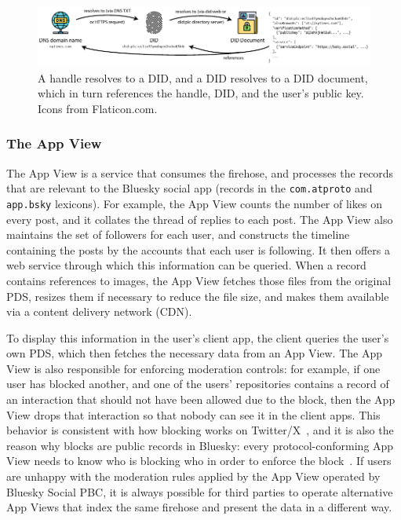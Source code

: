 \documentclass[sigconf]{acmart}
\begin{document}
\begin{figure}
    \centering
    \includegraphics[width=\linewidth]{identity.pdf}
    \caption{A handle resolves to a DID, and a DID resolves to a DID document, which in turn references the handle, DID, and the user's public key. Icons from Flaticon.com.}
    \label{fig:identity}
\end{figure}


\subsubsection{The App View}\label{sec:appview}

The App View is a service that consumes the firehose, and processes the records that are relevant to the Bluesky social app (records in the \texttt{com.atproto} and \texttt{app.bsky} lexicons).
For example, the App View counts the number of likes on every post, and it collates the thread of replies to each post.
The App View also maintains the set of followers for each user, and constructs the timeline containing the posts by the accounts that each user is following.
It then offers a web service through which this information can be queried.
When a record contains references to images, the App View fetches those files from the original PDS, resizes them if necessary to reduce the file size, and makes them available via a content delivery network (CDN).

To display this information in the user's client app, the client queries the user's own PDS, which then fetches the necessary data from an App View.
The App View is also responsible for enforcing moderation controls: for example, if one user has blocked another, and one of the users' repositories contains a record of an interaction that should not have been allowed due to the block, then the App View drops that interaction so that nobody can see it in the client apps.
This behavior is consistent with how blocking works on Twitter/X~\cite{TwitterBlock}, and it is also the reason why blocks are public records in Bluesky: every protocol-conforming App View needs to know who is blocking who in order to enforce the block~\cite{PublicBlocks,PrivateBlocks}.
If users are unhappy with the moderation rules applied by the App View operated by Bluesky Social PBC, it is always possible for third parties to operate alternative App Views that index the same firehose and present the data in a different way.
\end{document}
